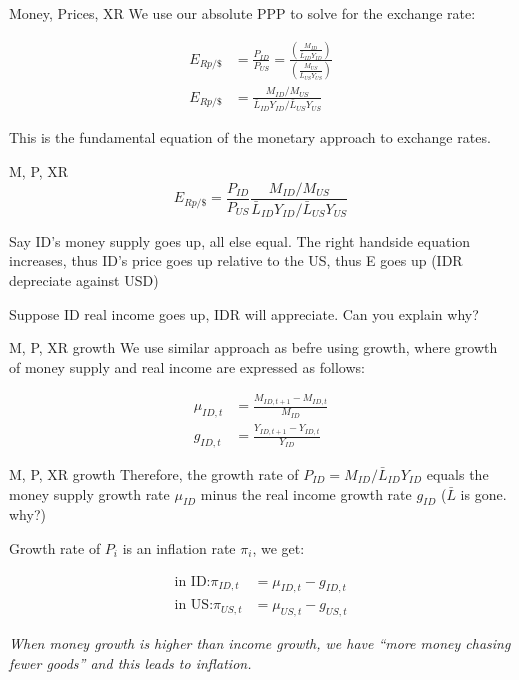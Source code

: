 \documentclass[
  ignorenonframetext,
]{beamer}
\begin{document}
\begin{frame}{Money, Prices, XR}
\label{money-prices-xr}
We use our absolute PPP to solve for the exchange rate:

\begin{align*}
E_{Rp/\$}&=\frac{P_{ID}}{P_{US}}=\frac{\left(\frac{M_{ID}}{\bar{L}_{ID}Y_{ID}}\right)}{\left(\frac{M_{US}}{\bar{L}_{US}Y_{US}}\right)} \\
E_{Rp/\$}&=\frac{M_{ID}/M_{US}}{\bar{L}_{ID}Y_{ID}/\bar{L}_{US}Y_{US}}
\end{align*}

This is the fundamental equation of the monetary approach to exchange
rates.
\end{frame}

\begin{frame}{M, P, XR}
\label{m-p-xr}
\begin{equation}
E_{Rp/\$}=\frac{P_{ID}}{P_{US}}\frac{M_{ID}/M_{US}}{\bar{L}_{ID}Y_{ID}/\bar{L}_{US}Y_{US}}
\end{equation}

Say ID's money supply goes up, all else equal. The right handside
equation increases, thus ID's price goes up relative to the US, thus E
goes up (IDR depreciate against USD)

Suppose ID real income goes up, IDR will appreciate. Can you explain
why?
\end{frame}

\begin{frame}{M, P, XR growth}
\label{m-p-xr-growth}
We use similar approach as befre using growth, where growth of money
supply and real income are expressed as follows:

\begin{align*}
\mu_{ID,t}&=\frac{M_{ID,t+1}-M_{ID,t}}{M_{ID}} \\
g_{ID,t}&=\frac{Y_{ID,t+1}-Y_{ID,t}}{Y_{ID}}
\end{align*}
\end{frame}

\begin{frame}{M, P, XR growth}
\label{m-p-xr-growth-1}
Therefore, the growth rate of \(P_{ID}=M_{ID}/\bar{L}_{ID}Y_{ID}\)
equals the money supply growth rate \(\mu_{ID}\) minus the real income
growth rate \(g_{ID}\) (\(\bar{L}\) is gone. why?)

Growth rate of \(P_{i}\) is an inflation rate \(\pi_{i}\), we get:

\begin{align*}
\text{in ID:} \pi_{ID,t}&=\mu_{ID,t}-g_{ID,t} \\
\text{in US:} \pi_{US,t}&=\mu_{US,t}-g_{US,t}
\end{align*}

\emph{When money growth is higher than income growth, we have ``more
money chasing fewer goods'' and this leads to inflation.}
\end{frame}
\end{document}
